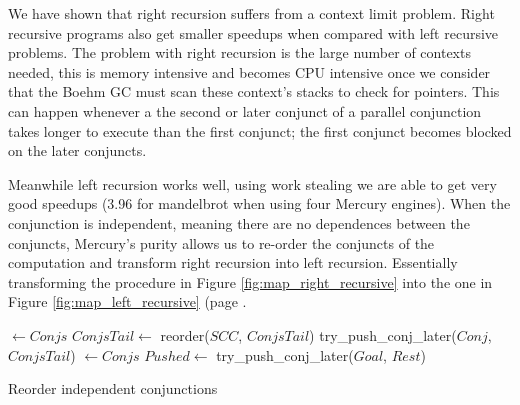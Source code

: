 

We have shown that right recursion suffers from a context limit problem.
Right recursive programs also get smaller speedups when compared with left
recursive problems.
The problem with right recursion is the large number of contexts needed,
this is memory intensive and becomes CPU intensive once we consider that
the Boehm GC must scan these context's stacks to check for pointers.
This can happen whenever a the second or later
conjunct of a parallel conjunction
takes longer to execute than the first conjunct;
the first conjunct becomes blocked on the later conjuncts.

Meanwhile left recursion works well,
using work stealing we are able to get very good speedups (3.96 for
mandelbrot when using four Mercury engines).
When the conjunction is independent,
meaning there are no dependences between the conjuncts,
Mercury's purity allows us to re-order the conjuncts of the computation and
transform right recursion into left recursion.
Essentially transforming the procedure in Figure
\ref{fig:map_right_recursive} into the one in Figure
\ref{fig:map_left_recursive} (page \pageref{fig:map_right_recursive}.

\begin{algorithm}
\begin{algorithmic}
        \State \Return \nil
    \Else
        \State {} $\gets Conjs$
        \State $ConjsTail \gets$ reorder($SCC$, $ConjsTail$)
            \State \Return {}
        \Else
            \State \Return try\_push\_conj\_later($Conj$, $ConjsTail$)
        \EndIf
    \EndIf
\EndProcedure
{}
        \State \Return {}
    \Else
        \State {} $\gets Conjs$
            \State $Pushed \gets$ try\_push\_conj\_later($Goal$, $Rest$)
            \State \Return {}
        \Else
            \State \Return {}
        \EndIf
    \EndIf
\EndProcedure
\end{algorithmic}
\caption{Reorder independent conjunctions}
\label{alg:reorder_conjunction}
\end{algorithm}

